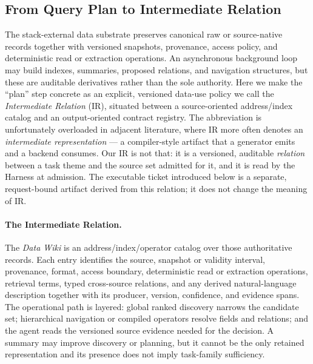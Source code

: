 \subsection{From Query Plan to Intermediate Relation}
\label{sec:intermediate-relation}

The stack-external data substrate preserves canonical raw or source-native records together with versioned snapshots, provenance, access policy, and deterministic read or extraction operations. An asynchronous background loop may build indexes, summaries, proposed relations, and navigation structures, but these are auditable derivatives rather than the sole authority. Here we make the ``plan'' step concrete as an explicit, versioned data-use policy we call the \textit{Intermediate Relation} (IR), situated between a source-oriented address/index catalog and an output-oriented contract registry. The abbreviation is unfortunately overloaded in adjacent literature, where IR more often denotes an \textit{intermediate representation} --- a compiler-style artifact that a generator emits and a backend consumes. Our IR is not that: it is a versioned, auditable \textit{relation} between a task theme and the source set admitted for it, and it is read by the Harness at admission. The executable ticket introduced below is a separate, request-bound artifact derived from this relation; it does not change the meaning of IR.

\paragraph{The Intermediate Relation.}
The \textit{Data Wiki} is an address/index/operator catalog over those authoritative records. Each entry identifies the source, snapshot or validity interval, provenance, format, access boundary, deterministic read or extraction operations, retrieval terms, typed cross-source relations, and any derived natural-language description together with its producer, version, confidence, and evidence spans. The operational path is layered: global ranked discovery narrows the candidate set; hierarchical navigation or compiled operators resolve fields and relations; and the agent reads the versioned source evidence needed for the decision. A summary may improve discovery or planning, but it cannot be the only retained representation and its presence does not imply task-family sufficiency.

